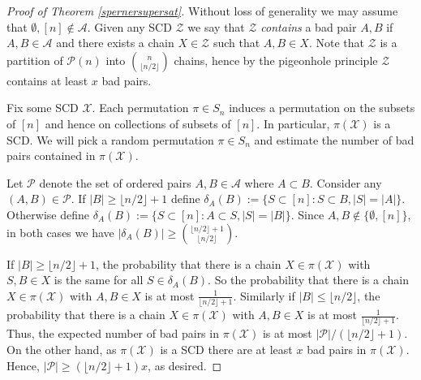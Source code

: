 \documentclass[11pt]{article}
\numberwithin{equation}{section}
\begin{document}
\begin{proof}[Proof of Theorem \ref{spernersupersat}]
Without loss of generality we may assume that $\emptyset, [n] \notin \mathcal A$.
Given any SCD $\mathcal{Z}$ we say  that $\mathcal{Z}$ \emph{contains} a bad pair $A,B$ if $A,B\in\mathcal{A}$ and there exists a chain $X\in\mathcal{Z}$ such that $A,B\in X$. Note that $\mathcal{Z}$ is a partition of $\mathcal{P}(n)$ into $\binom{n}{\lfloor n/2 \rfloor}$ chains, hence by the pigeonhole principle $\mathcal{Z}$ contains at least $x$ bad pairs. 

Fix some SCD $\mathcal X$.
Each permutation $\pi\in S_n$ induces a permutation on the subsets of $[n]$ and hence on collections of subsets of $[n]$. 
In particular, $\pi (\mathcal X)$ is a SCD.
We will pick a random permutation $\pi\in S_n$ and  estimate the number of bad pairs contained in $\pi(\mathcal{X})$. 

Let $\mathcal P$ denote the set of ordered pairs $A,B\in \mathcal A $ where $A\subset B$.
Consider any $(A,B) \in \mathcal P$.
If $|B|\geq \lfloor n/2\rfloor +1$ define   $\delta_A(B):=\{S\subset [n]:S\subset B, |S|=|A|\}$. Otherwise define $\delta_A(B):=\{S\subset [n]:A\subset S, |S|=|B|\}$.
Since  $A,B\notin \{\emptyset,[n]\}$, in both cases we have $|\delta_A(B)|\geq \binom{\lfloor n/2\rfloor +1}{\lfloor n/2\rfloor}$.

If $|B|\geq \lfloor n/2\rfloor +1$,
the probability that there is a chain $X\in\pi(\mathcal{X})$ with $S,B\in X$ is the same for all $S\in \delta_A(B)$. So the probability that there is a chain $X\in\pi(\mathcal{X})$ with $A,B\in X$ is at most $\frac{1}{\lfloor n/2 \rfloor +1}$. 
Similarly if $|B|\leq \lfloor n/2\rfloor $, the probability that there is a chain $X\in\pi(\mathcal{X})$ with $A,B\in X$ is at most $\frac{1}{\lfloor n/2 \rfloor +1}$. 
Thus, the expected number of bad pairs in $\pi(\mathcal{X})$ is at most $|\mathcal P|/(\lfloor n/2 \rfloor +1)$. On the other hand, as $\pi(\mathcal{X})$ is a SCD there are at least $x$ bad pairs in $\pi(\mathcal{X})$. Hence,
$|\mathcal P| \geq \left(\lfloor n/2\rfloor +1\right)x$, as desired.
\end{proof}
\end{document}
